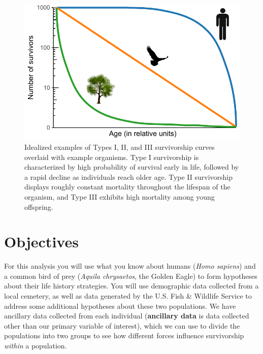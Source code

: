 \documentclass[11pt,]{article}
\begin{document}
\begin{figure}
\centering
\includegraphics{../_chapter_materials/base_plot.pdf}
\caption{Idealized examples of Types I, II, and III survivorship curves
overlaid with example organisms. Type I survivorship is characterized by
high probability of survival early in life, followed by a rapid decline
as individuals reach older age. Type II survivorship displays roughly
constant mortality throughout the lifespan of the organism, and Type III
exhibits high mortality among young offspring.}
\end{figure}

\section{Objectives}\label{objectives}

For this analysis you will use what you know about humans (\emph{Homo
sapiens}) and a common bird of prey (\emph{Aquila chrysaetos}, the
Golden Eagle) to form hypotheses about their life history strategies.
You will use demographic data collected from a local cemetery, as well
as data generated by the U.S. Fish \& Wildlife Service to address some
additional hypotheses about these two populations. We have ancillary
data collected from each individual (\textbf{ancillary data} is data
collected other than our primary variable of interest), which we can use
to divide the populations into two groups to see how different forces
influence survivorship \emph{within} a population.
\end{document}
